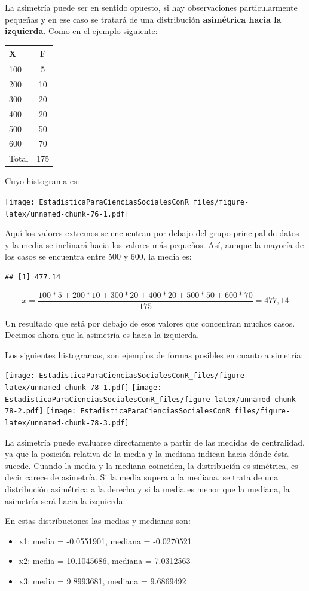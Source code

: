 \documentclass[]{book}
\providecommand{\tightlist}{%
  \setlength{\itemsep}{0pt}\setlength{\parskip}{0pt}}
\begin{document}
La asimetría puede ser en sentido opuesto, si hay observaciones
particularmente pequeñas y en ese caso se tratará de una distribución
\textbf{asimétrica hacia la izquierda}. Como en el ejemplo siguiente:

\begin{longtable}[]{@{}lc@{}}
\toprule
X & F\tabularnewline
\midrule
\endhead
100 & 5\tabularnewline
200 & 10\tabularnewline
300 & 20\tabularnewline
400 & 20\tabularnewline
500 & 50\tabularnewline
600 & 70\tabularnewline
Total & 175\tabularnewline
\bottomrule
\end{longtable}

Cuyo histograma es:

\texttt{[image: EstadisticaParaCienciasSocialesConR\_files/figure-latex/unnamed-chunk-76-1.pdf]}

Aquí los valores extremos se encuentran por debajo del grupo principal
de datos y la media se inclinará hacia los valores más pequeños. Así,
aunque la mayoría de los casos se encuentra entre 500 y 600, la media
es:

\begin{verbatim}
## [1] 477.14
\end{verbatim}

\[\overline{x} = \frac{100*5 + 200*10 + 300*20 + 400*20 + 500*50 + 600*70}{175} = 477,14\]

Un resultado que está por debajo de esos valores que concentran muchos
casos. Decimos ahora que la asimetría es hacia la izquierda.

Los siguientes histogramas, son ejemplos de formas posibles en cuanto a simetría:

\texttt{[image: EstadisticaParaCienciasSocialesConR\_files/figure-latex/unnamed-chunk-78-1.pdf]} \texttt{[image: EstadisticaParaCienciasSocialesConR\_files/figure-latex/unnamed-chunk-78-2.pdf]} \texttt{[image: EstadisticaParaCienciasSocialesConR\_files/figure-latex/unnamed-chunk-78-3.pdf]}

La asimetría puede evaluarse directamente a partir de las medidas de
centralidad, ya que la posición relativa de la media y la mediana
indican hacia dónde ésta sucede. Cuando la media y la mediana coinciden,
la distribución es simétrica, es decir carece de asimetría. Si la media
supera a la mediana, se trata de una distribución asimétrica a la
derecha y si la media es menor que la mediana, la asimetría será hacia
la izquierda.

En estas distribuciones las medias y medianas son:

\begin{itemize}
\tightlist
\item
  x1: media = -0.0551901, mediana = -0.0270521
\item
  x2: media = 10.1045686, mediana = 7.0312563
\item
  x3: media = 9.8993681, mediana = 9.6869492
\end{itemize}
\end{document}
